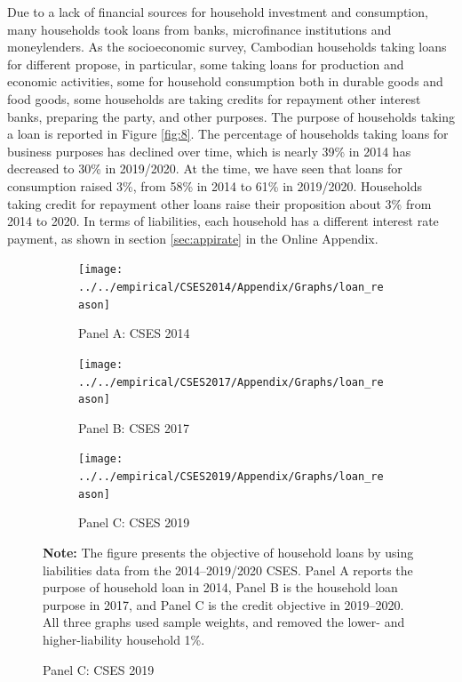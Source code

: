 \documentclass[11pt,letterpaper]{article}
\begin{document}
Due to a lack of financial sources for household investment and consumption, many households took loans from banks, microfinance institutions and moneylenders. As the socioeconomic survey, Cambodian households taking loans for different propose, in particular, some taking loans for production and economic activities, some for household consumption both in durable goods and food goods, some households are taking credits for repayment other interest banks, preparing the party, and other purposes. The purpose of households taking a loan is reported in Figure \ref{fig:8}. The percentage of households taking loans for business purposes has declined over time, which is nearly 39\% in 2014 has decreased to 30\% in 2019/2020. At the time, we have seen that loans for consumption raised 3\%, from 58\% in 2014 to 61\% in 2019/2020. Households taking credit for repayment other loans raise their proposition about 3\% from 2014 to 2020. In terms of liabilities, each household has a different interest rate payment, as shown in section \ref{sec:appirate} in the Online Appendix. 

\begin{figure}[h]
	\caption{ The purposes for household loans over 2014--2020}
	\label{fig:8}
	\begin{subfigure}[b]{0.33\linewidth}
		\caption*{Panel A: CSES 2014} \vspace{-.5em}
		\label{fig:3a}
		\texttt{[image: ../../empirical/CSES2014/Appendix/Graphs/loan\_reason]} 
	\end{subfigure}%
	\hfil
	\begin{subfigure}[b]{0.33\linewidth}
		\caption*{Panel B: CSES 2017} \vspace{-.5em}
		\label{fig:3b}
		\texttt{[image: ../../empirical/CSES2017/Appendix/Graphs/loan\_reason]} 
	\end{subfigure}
	\hfil
	\begin{subfigure}[b]{0.33\linewidth}
		\caption*{Panel C: CSES 2019} \vspace{-.5em}
		\label{fig:3c}
		\texttt{[image: ../../empirical/CSES2019/Appendix/Graphs/loan\_reason]} 
	\end{subfigure}
	\begin{tablenotes}
		\footnotesize
		\item \textbf{Note:} The figure presents the objective of household loans  by using liabilities data from the 2014--2019/2020 CSES. Panel A reports the purpose of household loan in 2014, Panel B is the household loan purpose in 2017, and Panel C is the credit objective in 2019--2020. All three graphs used sample weights, and removed the lower- and higher-liability household 1\%.  
	\end{tablenotes} 
	
\end{figure}
\end{document}
